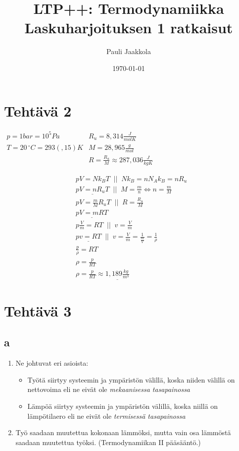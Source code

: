 \documentclass[12pt,a4paper,finnish]{article}
\title{LTP++: Termodynamiikka\\Laskuharjoituksen 1 ratkaisut}
\date{\today}
\author{Pauli Jaakkola}
\begin{document}
\maketitle
\tableofcontents
\newpage

\section{Tehtävä 2}

\begin{math}
\begin{array}{ll}
 p = 1bar = 10^5 Pa & R_u = 8,314 \frac{J}{molK}\\
 T = 20\,^{\circ}C = 293(,15)K & M = 28,965 \frac{g}{mol}\\
 & R = \frac{R_u}{M} \approx 287,036 \frac{J}{kgK}
\end{array}
\end{math}

\begin{align}
 &pV = Nk_BT \;\;\bigg|\bigg|\;\; Nk_B = nN_Ak_B = nR_u\\
 &\underline{pV = nR_uT} \;\;\bigg|\bigg|\;\; M = \frac{m}{n} \Leftrightarrow n = \frac{m}{M}\\
 &pV = \frac{m}{M}R_uT \;\;\bigg|\bigg|\;\; R = \frac{R_u}{M}\\
 &\underline{pV = mRT}\\
 &p\frac{V}{m} = RT \;\;\bigg|\bigg|\;\; v = \frac{V}{m}\\
 &\underline{pv = RT} \;\;\bigg|\bigg|\;\; v = \frac{V}{m} = \frac{1}{\frac{m}{V}} = \frac{1}{\rho}\\
 &\frac{p}{\rho} = RT\\
 &\rho = \frac{p}{RT}\\
 &\rho = \frac{p}{RT} \approx \underline{1,189 \frac{kg}{m^3}}
\end{align}

\section{Tehtävä 3}

\subsection{a}
\begin{enumerate}
 \item Ne johtuvat eri asioista:
 \begin{itemize}
  \item Työtä siirtyy systeemin ja ympäristön välillä, koska niiden välillä on nettovoima
    eli ne eivät ole \textit{mekaanisessa tasapainossa}
  \item Lämpöä siirtyy systeemin ja ympäristön välillä, koska niillä on lämpötilaero
    eli ne eivät ole \textit{termisessä tasapainossa}
 \end{itemize}
 \item Työ saadaan muutettua kokonaan lämmöksi, mutta vain osa lämmöstä saadaan muutettua työksi.
  (Termodynamiikan II pääsääntö.)
\end{enumerate}
\end{document}

